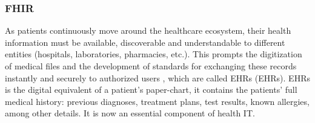 
\subsubsection{\acf{FHIR}}

As patients continuously move around the healthcare ecosystem, their health information must be available, discoverable and understandable to different entities (hospitals, laboratories, pharmacies, etc.). This prompts the digitization of medical files and the development of standards for exchanging these records instantly and securely to authorized users \cite{HL72019}, which are called \acl{EHR}s (\acs{EHR}s). \acs{EHR}s is the digital equivalent of a patient's paper-chart, it contains the patients' full medical history: previous diagnoses, treatment plans, test results, known allergies, among other details. It is now an essential component of health IT. 


